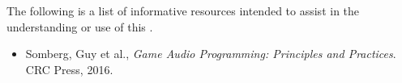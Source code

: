 
\pnum
The following is a list of informative resources intended to assist in the understanding or use of this \documenttypename.

\begin{itemize}
\item Somberg, Guy et al., \textit{Game Audio Programming: Principles and Practices}. CRC Press, 2016.
\end{itemize}
